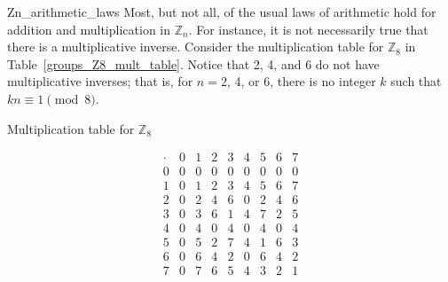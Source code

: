 \begin{example}{Zn_arithmetic_laws}
Most, but not all, of the usual laws of arithmetic hold for addition and multiplication in ${\mathbb Z}_n$.  For instance, it is not necessarily true that there is a multiplicative inverse.  Consider the multiplication table for ${\mathbb Z}_8$ in Table~\ref{groups_Z8_mult_table}.  Notice that 2, 4, and 6 do not have multiplicative inverses; that is, for $n = 2$, 4, or 6, there is no integer $k$ such that $k n \equiv 1 \pmod{ 8}$.
\mbox{\hspace*{1in}}
\end{example}

\begin{table}[htb]\label{groups_Z8_mult_table}
\caption{Multiplication table for ${\mathbb Z}_8$}{\small
\[
\begin{array}{c|cccccccc}
\cdot & 0 & 1 & 2 & 3 & 4 & 5 & 6 & 7 \\
\hline
0     & 0 & 0 & 0 & 0 & 0 & 0 & 0 & 0 \\
1     & 0 & 1 & 2 & 3 & 4 & 5 & 6 & 7 \\
2     & 0 & 2 & 4 & 6 & 0 & 2 & 4 & 6 \\
3     & 0 & 3 & 6 & 1 & 4 & 7 & 2 & 5 \\
4     & 0 & 4 & 0 & 4 & 0 & 4 & 0 & 4 \\
5     & 0 & 5 & 2 & 7 & 4 & 1 & 6 & 3 \\
6     & 0 & 6 & 4 & 2 & 0 & 6 & 4 & 2 \\
7     & 0 & 7 & 6 & 5 & 4 & 3 & 2 & 1
\end{array}
\]
}
\end{table}

